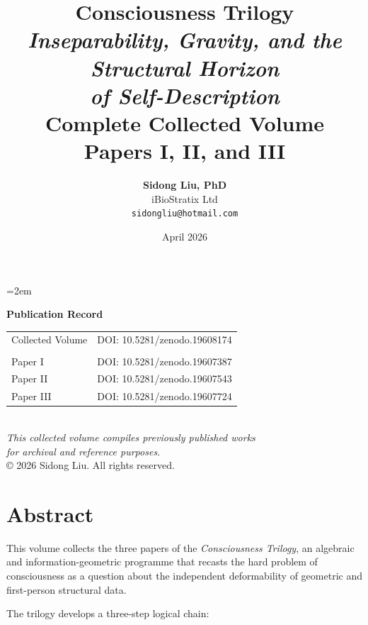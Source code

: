 \documentclass[12pt,a4paper,openany]{book}
\title{
  \vspace{-2cm}
  {\Huge\textbf{Consciousness Trilogy}}\\[1cm]
  {\Large\textit{Inseparability, Gravity, and the Structural Horizon\\
  of Self-Description}}\\[2cm]
  {\large Complete Collected Volume}\\[0.5cm]
  {\normalsize Papers I, II, and III}
}
\author{
  \textbf{Sidong Liu, PhD}\\[0.5em]
  iBioStratix Ltd\\[0.3em]
  \texttt{sidongliu@hotmail.com}
}
\date{April 2026}
\begin{document}
\emergencystretch=2em
\raggedbottom
{}

\frontmatter
\maketitle

\newpage
\thispagestyle{empty}
\vspace*{\fill}
\begin{center}
\textbf{Publication Record}\\[2em]
\begin{tabular}{ll}
Collected Volume & DOI: 10.5281/zenodo.19608174 \\
\\[-0.2em]
Paper I & DOI: 10.5281/zenodo.19607387 \\
Paper II & DOI: 10.5281/zenodo.19607543 \\
Paper III & DOI: 10.5281/zenodo.19607724 \\
\end{tabular}
\\[3em]
\textit{This collected volume compiles previously published works\\
for archival and reference purposes.}
\\[2em]
\copyright{} 2026 Sidong Liu. All rights reserved.
\end{center}
\vspace*{\fill}

\chapter*{Abstract}

This volume collects the three papers of the \emph{Consciousness Trilogy},
an algebraic and information-geometric programme that recasts the hard
problem of consciousness as a question about the independent deformability
of geometric and first-person structural data.

The trilogy develops a three-step logical chain:
\end{document}
